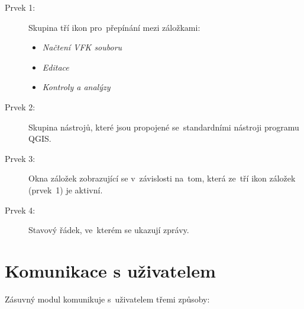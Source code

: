 \begin{description}
	\item[Prvek 1:] Skupina tří ikon pro~přepínání mezi záložkami:
	\begin{itemize}[leftmargin=1.5cm, noitemsep]
		\item {} \textit{Načtení VFK
souboru}
		\item {} \textit{Editace}
		\item {}
\textit{Kontroly a analýzy}
 	\end{itemize}
	\item[Prvek 2:] Skupina nástrojů, které jsou propojené
se~standardními nástroji programu QGIS.
	\item[Prvek 3:] Okna záložek zobrazující se v~závislosti
na~tom, která ze~tří ikon záložek (prvek~1) je aktivní.
	\item[Prvek 4:] Stavový řádek, ve~kterém se ukazují zprávy.
\end{description}

\newpage

\section{Komunikace s uživatelem}
\label{manual_komunikace}

Zásuvný modul komunikuje s~uživatelem třemi způsoby:

